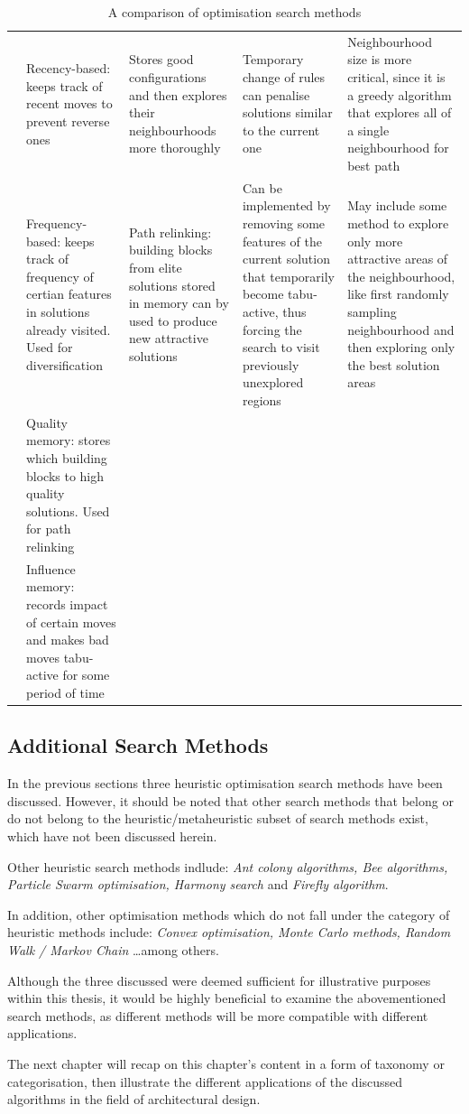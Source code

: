 \begin{table}
{\begin{tabular}[h]{|p{1cm}| p{}p{}p{}p{}|}
 &Recency-based: keeps track of recent moves to prevent reverse ones&Stores good configurations and then explores their neighbourhoods more thoroughly&Temporary change of rules can penalise solutions similar to the current one&Neighbourhood size is more critical, since it is a greedy algorithm that explores all of a single neighbourhood for best path\\
 &Frequency-based: keeps track of frequency of certian features in solutions already visited. Used for diversification&Path relinking: building blocks from elite solutions stored in memory can by used to produce new attractive solutions&Can be implemented by removing some features of the current solution that temporarily become tabu-active, thus forcing the search to visit previously unexplored regions&May include some method to explore only more attractive areas of the neighbourhood, like first randomly sampling neighbourhood and then exploring only the best solution areas\\
 &Quality memory: stores which building blocks to high quality solutions. Used for path relinking& & & \\
 &Influence memory: records impact of certain moves and makes bad moves tabu-active for some period of time& & & \\\hline
\end{tabular}}
\caption[Optimisation Search Method Characteristics]{A comparison of optimisation search methods \cite{caldas01}}
\label{table:OptMethCmprsn}
\end{table}

\clearpage
\subsection{Additional Search Methods}

In the previous sections three heuristic optimisation search methods have been discussed. However, it should be noted that other search methods that belong or do not belong to the heuristic/metaheuristic subset of search methods exist, which have not been discussed herein.

Other heuristic search methods indlude: \emph{Ant colony algorithms, Bee algorithms, Particle Swarm optimisation, Harmony search} and \emph{Firefly algorithm}.

In addition, other optimisation methods which do not fall under the category of heuristic methods include: \emph{Convex optimisation, Monte Carlo methods, Random Walk / Markov Chain} \ldots among others.

Although the three discussed were deemed sufficient for illustrative purposes within this thesis, it would be highly beneficial to examine the abovementioned search methods, as different methods will be more compatible with different applications.

The next chapter will recap on this chapter's content in a form of taxonomy or categorisation, then illustrate the different applications of the discussed algorithms in the field of architectural design.
